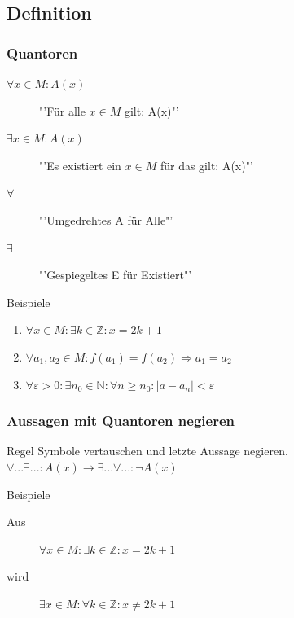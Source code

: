 \documentclass{beamer}
\begin{document}
\subsection{Definition}
\begin{frame}
  \frametitle{Quantoren}
  \begin{definition}
    \begin{description}
      \item[$\forall x \in M: A(x)$] "'Für alle $x \in M$ gilt: A(x)"' 
      \item[$\exists x \in M: A(x)$] "'Es existiert ein $x \in M$ für das gilt: A(x)"'
    \end{description}
  \end{definition} \pause
  \begin{description}
    \item[$\forall$] "'Umgedrehtes A für Alle"'
    \item[$\exists$] "'Gespiegeltes E für Existiert"'
  \end{description}
  \begin{exampleblock}{Beispiele}
    \begin{enumerate}
      \item $\forall x \in M: \exists k \in \mathbb{Z}: x = 2k+1$
      \item $\forall a_1, a_2 \in M: f(a_1) = f(a_2) \Rightarrow a_1 = a_2$
      \item $\forall \varepsilon > 0: \exists n_0 \in \mathbb{N}: \forall n \geq n_0: |a-a_n| < \varepsilon$
    \end{enumerate}
  \end{exampleblock}
\end{frame}
\begin{frame}
  \frametitle{Aussagen mit Quantoren negieren}
  \begin{block}{Regel}
    Symbole vertauschen und letzte Aussage negieren. $\forall ... \exists ... : A(x) \longrightarrow \exists ... \forall ... : \neg A(x)$
  \end{block} \pause
  \begin{exampleblock}{Beispiele}
    \begin{description}
      \item[Aus] $\forall x \in M: \exists k \in \mathbb{Z}: x = 2k+1$ \pause
      \item[wird] $\exists x \in M: \forall k \in \mathbb{Z}: x \neq 2k+1$
    \end{description}
  \end{exampleblock}
\end{frame}
\end{document}
